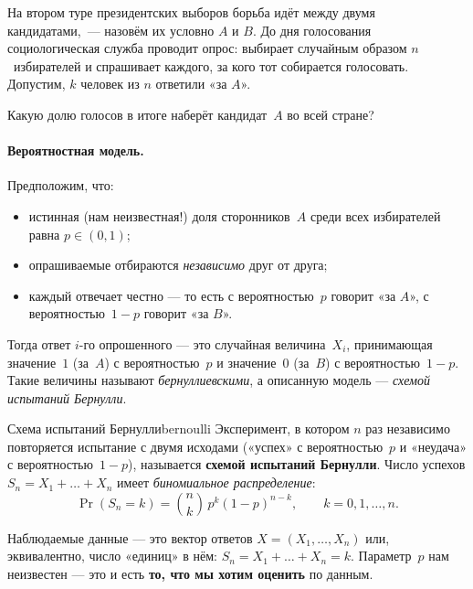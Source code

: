 На втором туре президентских выборов борьба идёт между двумя
кандидатами,~--- назовём их условно $A$ и $B$. До дня голосования
социологическая служба проводит опрос: выбирает случайным образом
$n$~избирателей и спрашивает каждого, за кого тот собирается
голосовать. Допустим, $k$ человек из $n$ ответили «за $A$».

Какую долю голосов в итоге наберёт кандидат~$A$ во всей стране?

\paragraph{Вероятностная модель.}
Предположим, что:
\begin{itemize}\itemsep1pt
  \item истинная (нам неизвестная!) доля сторонников~$A$ среди всех
        избирателей равна $p\in(0,1)$;
  \item опрашиваемые отбираются \emph{независимо} друг от друга;
  \item каждый отвечает честно — то есть с вероятностью~$p$ говорит
        «за $A$», с вероятностью~$1-p$ говорит «за $B$».
\end{itemize}

Тогда ответ $i$-го опрошенного — это случайная величина~$X_i$, принимающая
значение~$1$ (за~$A$) с вероятностью~$p$ и значение~$0$ (за~$B$) с
вероятностью~$1-p$. Такие величины называют \emph{бернуллиевскими}, а
описанную модель — \emph{схемой испытаний Бернулли}.

\begin{definition}{Схема испытаний Бернулли}{bernoulli}
Эксперимент, в котором $n$ раз независимо повторяется
испытание с двумя исходами («успех» с вероятностью~$p$ и «неудача» с
вероятностью~$1-p$), называется \textbf{схемой испытаний Бернулли}.
Число успехов $S_n=X_1+\dots+X_n$ имеет \emph{биномиальное распределение}:
\begin{equation}\label{eq:binom}
\Pr(S_n=k)=\binom{n}{k}\,p^{k}(1-p)^{n-k},\qquad k=0,1,\dots,n.
\end{equation}
\end{definition}

Наблюдаемые данные --- это вектор ответов $X=(X_1,\dots,X_n)$ или,
эквивалентно, число «единиц» в нём: $S_n=X_1+\dots+X_n=k$. Параметр~$p$
нам неизвестен --- это и есть \textbf{то, что мы хотим оценить} по данным.

